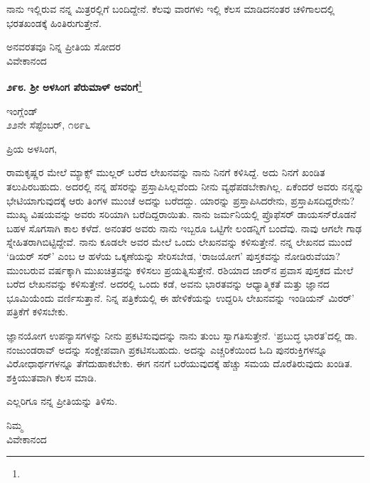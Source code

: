 ನಾನು ಇಲ್ಲಿರುವ ನನ್ನ ಮಿತ್ರರಲ್ಲಿಗೆ ಬಂದಿದ್ದೇನೆ. ಕೆಲವು ವಾರಗಳು ಇಲ್ಲಿ ಕೆಲಸ ಮಾಡಿದನಂತರ ಚಳಿಗಾಲದಲ್ಲಿ ಭರತಖಂಡಕ್ಕೆ ಹಿಂತಿರುಗುತ್ತೇನೆ.

{\flushright
ಅನವರತವೂ ನಿನ್ನ ಪ್ರೀತಿಯ ಸೋದರ\\ವಿವೇಕಾನಂದ\par}

\newpage

\begin{center}
\textbf{೨೯೮. ಶ‍್ರೀ ಅಳಸಿಂಗ ಪೆರುಮಾಳ್ ಅವರಿಗೆ}\footnote{}
\end{center}

\vspace{-0.5cm}

\begin{flushright}
ಇಂಗ್ಲೆಂಡ್\\೨೨ನೇ ಸೆಪ್ಟೆಂಬರ್, ೧೮೯೬
\end{flushright}

\noindent
ಪ್ರಿಯ ಅಳಸಿಂಗ,

ರಾಮಕೃಷ್ಣರ ಮೇಲೆ ಮ್ಯಾಕ್ಸ್ ಮುಲ್ಲರ್ ಬರೆದ ಲೇಖನವನ್ನು ನಾನು ನಿನಗೆ ಕಳಿಸಿದ್ದೆ. ಅದು ನಿನಗೆ ಖಂಡಿತ ತಲುಪಿರಬಹುದು. ಅದರಲ್ಲಿ ನನ್ನ ಹೆಸರನ್ನು ಪ್ರಸ್ತಾಪಿಸಿಲ್ಲವೆಂದು ನೀನು ವ್ಯಥೆಪಡಬೇಕಾಗಿಲ್ಲ. ಏಕೆಂದರೆ ಅವರು ನನ್ನನ್ನು ಭೇಟಿಯಾಗುವುದಕ್ಕೆ ಆರು ತಿಂಗಳ ಮುಂಚೆ ಅದನ್ನು ಬರೆದದ್ದು. ಯಾರನ್ನು ಪ್ರಸ್ತಾಪಿಸಿದರೇನು, ಪ್ರಸ್ತಾಪಿಸದಿದ್ದರೇನು? ಮುಖ್ಯ ವಿಷಯವನ್ನು ಅವರು ಸರಿಯಾಗಿ ಬರೆದಿದ್ದರಾಯಿತು. ನಾನು ಜರ್ಮನಿಯಲ್ಲಿ ಪ್ರೊಫೆಸರ್ ಡಾಯಸನ್‌ರೊಡನೆ ಬಹಳ ಸೊಗಸಾಗಿ ಕಾಲ ಕಳೆದೆ. ಅನಂತರ ಅವರು ನಾನು ಇಬ್ಬರೂ ಒಟ್ಟಿಗೇ ಲಂಡನ್ನಿಗೆ ಬಂದೆವು. ನಾವು ಆಗಲೇ ಗಾಢ ಸ್ನೇಹಿತರಾಗಿಬಿಟ್ಟಿದ್ದೇವೆ. ನಾನು ಕೂಡಲೇ ಅವರ ಮೇಲೆ ಒಂದು ಲೇಖನವನ್ನು ಕಳಿಸುತ್ತೇನೆ. ನನ್ನ ಲೇಖನದ ಮುಂದೆ ‘ಡಿಯರ್ ಸರ್’ ಎಂಬ ಆ ಹಳೆಯ ಒಕ್ಕಣೆಯನ್ನು ಸೇರಿಸಬೇಡ, ‘ರಾಜಯೋಗ’ ಪುಸ್ತಕವನ್ನು ನೋಡಿರುವೆಯಾ?ಮುಂಬರುವ ವರ್ಷಕ್ಕಾಗಿ ಮುಖಚಿತ್ರವನ್ನು ಕಳಿಸಲು ಪ್ರಯತ್ನಿಸುತ್ತೇನೆ. ರಶಿಯಾದ ಜಾರ್‌ನ ಪ್ರವಾಸ ಪುಸ್ತಕದ ಮೇಲೆ ಬರೆದ ಲೇಖನವನ್ನು ಕಳಿಸುತ್ತೇನೆ. ಅದರಲ್ಲಿ ಒಂದು ಕಡೆ, ಅವನು ಭಾರತವನ್ನು ಆಧ್ಯಾತ್ಮಿಕತೆ ಮತ್ತು ಜ್ಞಾನದ ಭೂಮಿಯೆಂದು ವರ್ಣಿಸುತ್ತಾನೆ. ನಿನ್ನ ಪತ್ರಿಕೆಯಲ್ಲಿ ಈ ಹೇಳಿಕೆಯನ್ನು ಉದ್ದರಿಸಿ ಲೇಖನವನ್ನು ಇಂಡಿಯನ್ ಮಿರರ್' ಪತ್ರಿಕೆಗೆ ಕಳಿಸಬೇಕು.

ಜ್ಞಾನಯೋಗ ಉಪನ್ಯಾಸಗಳನ್ನು ನೀನು ಪ್ರಕಟಿಸುವುದನ್ನು ನಾನು ತುಂಬ ಸ್ವಾಗತಿಸುತ್ತೇನೆ. ‘ಪ್ರಬುದ್ಧ ಭಾರತ’ದಲ್ಲಿ ಡಾ. ನಂಜುಂಡರಾವ್ ಅದನ್ನು ಸಂಕ್ಷೇಪವಾಗಿ ಪ್ರಕಟಿಸಬಹುದು. ಅದನ್ನು ಎಚ್ಚರಿಕೆಯಿಂದ ಓದಿ ಪುನರುಕ್ತಿಗಳನ್ನೂ ವಿರೋಧಾರ್ಥಗಳನ್ನೂ ತೆಗೆದುಹಾಕಬೇಕು. ಈಗ ನನಗೆ ಬರೆಯುವುದಕ್ಕೆ ಹೆಚ್ಚು ಸಮಯ ದೊರೆತಿರುವುದು ಖಂಡಿತ. ಶಕ್ತಿಯುತವಾಗಿ ಕೆಲಸ ಮಾಡಿ.

ಎಲ್ಲರಿಗೂ ನನ್ನ ಪ್ರೀತಿಯನ್ನು ತಿಳಿಸು.

\vspace{-0.5cm}

{\flushright
ನಿಮ್ಮ\\ವಿವೇಕಾನಂದ\par}

